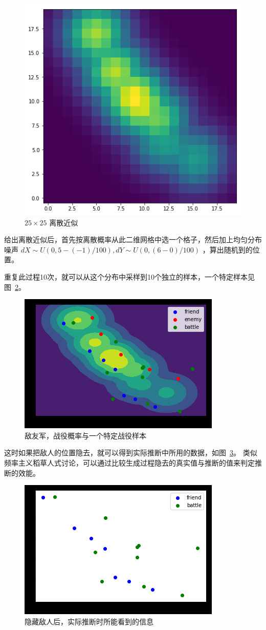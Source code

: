 \documentclass{sicnuthesis}
\begin{document}
\begin{figure}[htb]
\includegraphics[width=0.6\linewidth]{gridify.png}
\caption{$25 \times 25$ 离散近似}
\label{fig:gridify}
\end{figure}


给出离散近似后，首先按离散概率从此二维网格中选一个格子，然后加上均匀分布噪声 
$dX \sim U(0,5-(-1)/100),dY \sim U(0,(6-0)/100)$ ，算出随机到的位置。

重复此过程10次，就可以从这个分布中采样到10个独立的样本，一个特定样本见图~\ref{fig:stateSampleBattle}。


\begin{figure}[htb]
\includegraphics[width=0.6\linewidth]{state_sample_battle.png}
\caption{敌友军，战役概率与一个特定战役样本}
\label{fig:stateSampleBattle}
\end{figure}


这时如果把敌人的位置隐去，就可以得到实际推断中所用的数据，如图~\ref{fig:stateNoEnemy}。
类似频率主义稻草人式讨论，可以通过比较生成过程隐去的真实值与推断的值来判定推断的效能。

\begin{figure}[htb]
\includegraphics[width=0.6\linewidth]{state_no_enemy.png}
\caption{隐藏敌人后，实际推断时所能看到的信息}
\label{fig:stateNoEnemy}
\end{figure}
\end{document}
